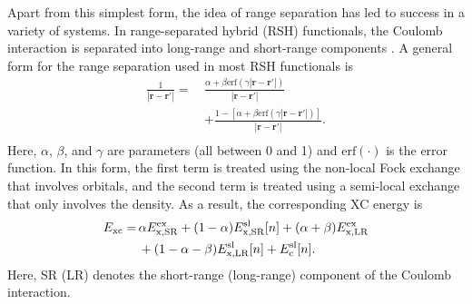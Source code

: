 \documentclass[aip, amsmath, amssymb, reprint, longbibliography]{revtex4-2}
\def\mr{\mathbf{r}}
\begin{document}
Apart from this simplest form, the idea of range separation has led to success in a variety of systems. In range-separated hybrid (RSH) functionals\cite{BLS10,KSRB12,KB14}, the Coulomb interaction is separated into long-range and short-range components \cite{HSE03,TCS04,YTH04}. A general form for the range separation used in most RSH functionals is
\begin{equation}
\begin{split}
\frac{1}{|\mr-\mr'|}= \,& \frac{\alpha+\beta \mbox{erf}(\gamma |\mr-\mr'|)}{|\mr-\mr'|}\\
& +\frac{1-[\alpha+\beta \mbox{erf}(\gamma |\mr-\mr'|)]}{|\mr-\mr'|}. \\
\end{split}
\label{eq:rsh}
\end{equation}
Here, $\alpha$, $\beta$, and $\gamma$ are parameters (all between 0 and 1) and $\mbox{erf}(\cdot)$ is the error function. In this form, the first term is treated using the non-local Fock exchange that involves orbitals, and the second term is treated using a semi-local exchange that only involves the density. As a result, the corresponding XC energy is
\begin{equation}
\begin{split}
E_{\rm xc} = \, & \alpha E_{\rm x,SR}^{\rm ex}+(1-\alpha)E_{\rm x,SR}^{\rm sl}[n]+(\alpha+\beta)E_{\rm x,LR}^{\rm ex} \\
& +(1-\alpha-\beta)E_{\rm x,LR}^{\rm sl}[n]+E_{\rm c}^{\rm sl}[n]. \\
\end{split}
\label{eq:rshexc}
\end{equation}
Here, SR (LR) denotes the short-range (long-range) component of the Coulomb interaction.
\end{document}
